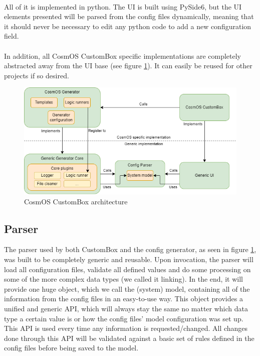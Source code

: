 \paragraph*{} All of it is implemented in python. The \ac{UI} is built using PySide6, but the \ac{UI} elements presented will be parsed from the config files dynamically, meaning that 
it should never be necessary to edit any python code to add a new configuration field.
\paragraph*{} In addition, all CosmOS CustomBox specific implementations are completely abstracted away from the \ac{UI} base (see figure \ref{fig:UI_architecture}). It can easily be reused for other projects if so desired.
\begin{figure}[H]
\begin{center}
\includegraphics[width=1\textwidth]{images/custombox_architecture}
\caption{CosmOS CustomBox architecture}
\label{fig:UI_architecture}
\end{center}
\end{figure}

\subsection{Parser}

The parser used by both CustomBox and the config generator, as seen in figure \ref{fig:UI_architecture}, was built to be completely generic and reusable. Upon invocation, the parser will load all configuration files,  validate all defined values and do some processing on some of the more complex data types (we called it linking). In the end, it will provide one huge object, which we call the (system) model, containing all of the information from the config files in an easy-to-use way. This object provides a unified and generic \ac{API}, which will always stay the same no matter which data type a certain value is or how the config files' model configuration was set up. This \ac{API} is used every time any information is requested/changed.  All changes done through this \ac{API} will be validated against a basic set of rules defined in the config files before being saved to the model.
